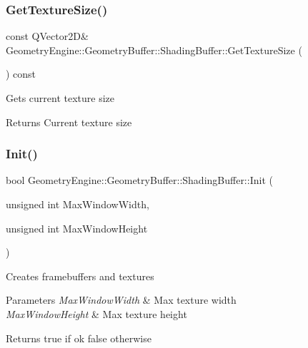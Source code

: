 \subsubsection{\texorpdfstring{GetTextureSize()}{GetTextureSize()}}
{\footnotesize\ttfamily const Q\+Vector2D\& Geometry\+Engine\+::\+Geometry\+Buffer\+::\+Shading\+Buffer\+::\+Get\+Texture\+Size (\begin{DoxyParamCaption}{ }\end{DoxyParamCaption}) const\hspace{0.3cm}{\ttfamily [inline]}}

Gets current texture size \begin{DoxyReturn}{Returns}
Current texture size 
\end{DoxyReturn}
\mbox{\label{class_geometry_engine_1_1_geometry_buffer_1_1_shading_buffer_af1fdd3ca773dce41a4fbe4bec2df12fa}} 
\subsubsection{\texorpdfstring{Init()}{Init()}}
{\footnotesize\ttfamily bool Geometry\+Engine\+::\+Geometry\+Buffer\+::\+Shading\+Buffer\+::\+Init (\begin{DoxyParamCaption}\item[{unsigned int}]{Max\+Window\+Width,  }\item[{unsigned int}]{Max\+Window\+Height }\end{DoxyParamCaption})}

Creates framebuffers and textures 
\begin{DoxyParams}{Parameters}
{\em Max\+Window\+Width} & Max texture width \\
\hline
{\em Max\+Window\+Height} & Max texture height \\
\hline
\end{DoxyParams}
\begin{DoxyReturn}{Returns}
true if ok false otherwise 
\end{DoxyReturn}
\mbox{\label{class_geometry_engine_1_1_geometry_buffer_1_1_shading_buffer_a154d3f1ba318675149ebac34471e0aec}} 
